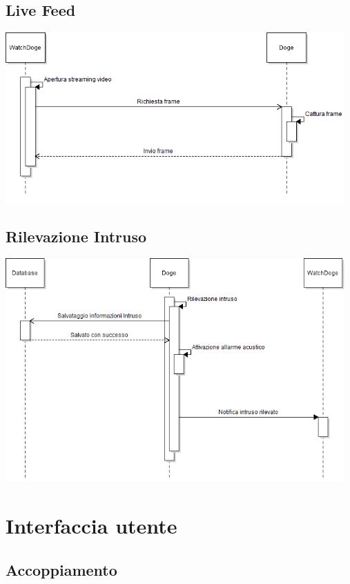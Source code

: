 \documentclass{article}
\begin{document}
\subsection{Live Feed}
\begin{center}
\includegraphics[width=13cm]{LiveFeed_Dsequenza.png}
\end{center}

\subsection{Rilevazione Intruso}
\begin{center}
\includegraphics[width=13cm]{Rilevazione_intrusione_DSequenza.png}
\end{center}

\section{Interfaccia utente}

\subsection{Accoppiamento}
\end{document}
